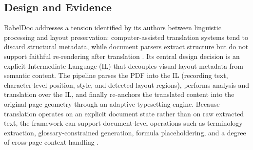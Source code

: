 \subsection{Design and Evidence}

BabelDoc addresses a tension identified by its authors between
linguistic processing and layout preservation: computer-assisted
translation systems tend to discard structural metadata, while document
parsers extract structure but do not support faithful re-rendering
after translation \cite{qi2026babeldoc}. Its central design decision is
an explicit Intermediate Language (IL) that decouples visual layout
metadata from semantic content. The pipeline parses the PDF into the IL
(recording text, character-level position, style, and detected layout
regions), performs analysis and translation over the IL, and finally
re-anchors the translated content into the original page geometry
through an adaptive typesetting engine. Because translation operates on
an explicit document state rather than on raw extracted text, the
framework can support document-level operations such as terminology
extraction, glossary-constrained generation, formula placeholdering,
and a degree of cross-page context handling \cite{qi2026babeldoc}.

